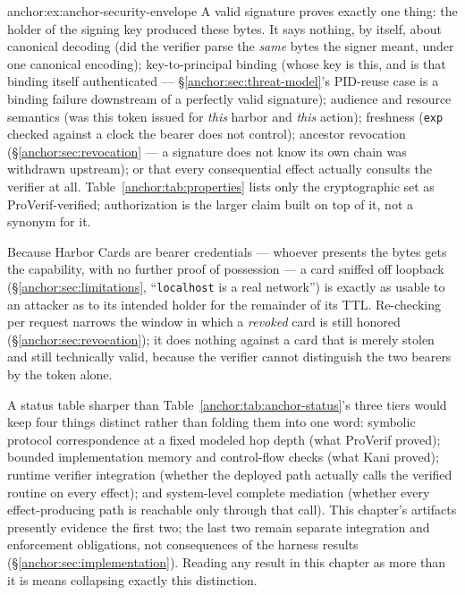 \begin{pdSolution}{anchor:ex:anchor-security-envelope}
A valid signature proves exactly one thing: the holder of the signing key produced these bytes. It says nothing, by itself, about canonical decoding (did the verifier parse the \emph{same} bytes the signer meant, under one canonical encoding); key-to-principal binding (whose key is this, and is that binding itself authenticated --- \S\ref{anchor:sec:threat-model}'s PID-reuse case is a binding failure downstream of a perfectly valid signature); audience and resource semantics (was this token issued for \emph{this} harbor and \emph{this} action); freshness (\texttt{exp} checked against a clock the bearer does not control); ancestor revocation (\S\ref{anchor:sec:revocation} --- a signature does not know its own chain was withdrawn upstream); or that every consequential effect actually consults the verifier at all. Table~\ref{anchor:tab:properties} lists only the cryptographic set as ProVerif-verified; authorization is the larger claim built on top of it, not a synonym for it.

Because Harbor Cards are bearer credentials --- whoever presents the bytes gets the capability, with no further proof of possession --- a card sniffed off loopback (\S\ref{anchor:sec:limitations}, ``\texttt{localhost} is a real network'') is exactly as usable to an attacker as to its intended holder for the remainder of its TTL. Re-checking per request narrows the window in which a \emph{revoked} card is still honored (\S\ref{anchor:sec:revocation}); it does nothing against a card that is merely stolen and still technically valid, because the verifier cannot distinguish the two bearers by the token alone.

A status table sharper than Table~\ref{anchor:tab:anchor-status}'s three tiers would keep four things distinct rather than folding them into one word: symbolic protocol correspondence at a fixed modeled hop depth (what ProVerif proved); bounded implementation memory and control-flow checks (what Kani proved); runtime verifier integration (whether the deployed path actually calls the verified routine on every effect); and system-level complete mediation (whether every effect-producing path is reachable only through that call). This chapter's artifacts presently evidence the first two; the last two remain separate integration and enforcement obligations, not consequences of the harness results (\S\ref{anchor:sec:implementation}). Reading any result in this chapter as more than it is means collapsing exactly this distinction.
\end{pdSolution}
